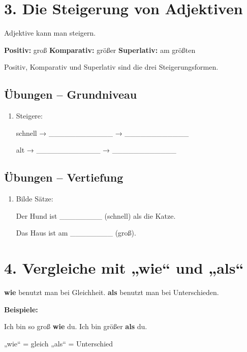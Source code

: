 \documentclass[a4paper,12pt]{article}
\begin{document}
\section*{3. Die Steigerung von Adjektiven}

Adjektive kann man steigern.

\textbf{Positiv:} groß  
\textbf{Komparativ:} größer  
\textbf{Superlativ:} am größten  

\begin{merksatz}
Positiv, Komparativ und Superlativ sind die drei Steigerungsformen.
\end{merksatz}

\subsection*{Übungen – Grundniveau}

\begin{enumerate}
\item Steigere:

schnell → \_\_\_\_\_\_\_\_\_\_\_\_ → \_\_\_\_\_\_\_\_\_\_\_\_

alt → \_\_\_\_\_\_\_\_\_\_\_\_ → \_\_\_\_\_\_\_\_\_\_\_\_
\end{enumerate}

\subsection*{Übungen – Vertiefung}

\begin{enumerate}
\item Bilde Sätze:

Der Hund ist \_\_\_\_\_\_\_\_ (schnell) als die Katze.

Das Haus ist am \_\_\_\_\_\_\_\_ (groß).
\end{enumerate}

\section*{4. Vergleiche mit „wie“ und „als“}

\textbf{wie} benutzt man bei Gleichheit.  
\textbf{als} benutzt man bei Unterschieden.

\textbf{Beispiele:}

Ich bin so groß \textbf{wie} du.  
Ich bin größer \textbf{als} du.  

\begin{merksatz}
„wie“ = gleich  
„als“ = Unterschied
\end{merksatz}
\end{document}
